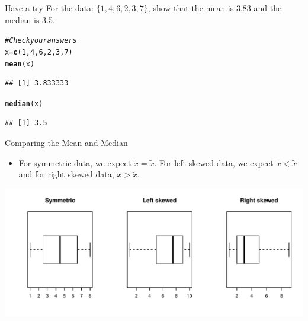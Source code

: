 \documentclass[t,xcolor=pdftex,dvipsnames,table]{beamer}
\makeatletter
\def\maxwidth{ %
  \ifdim\Gin@nat@width>\linewidth
    \linewidth
  \else
    \Gin@nat@width
  \fi
}
\newcommand{\hlnum}[1]{\textcolor[rgb]{0.686,0.059,0.569}{#1}}%
\newcommand{\hlcom}[1]{\textcolor[rgb]{0.678,0.584,0.686}{\textit{#1}}}%
\newcommand{\hlstd}[1]{\textcolor[rgb]{0.345,0.345,0.345}{#1}}%
\newcommand{\hlkwb}[1]{\textcolor[rgb]{0.69,0.353,0.396}{#1}}%
\newcommand{\hlkwd}[1]{\textcolor[rgb]{0.737,0.353,0.396}{\textbf{#1}}}%
\newenvironment{kframe}{%
 \def\at@end@of@kframe{}%
 \ifinner\ifhmode%
  \def\at@end@of@kframe{\end{minipage}}%
  \begin{minipage}{\columnwidth}%
 \fi\fi%
 \def\FrameCommand##1{\hskip\@totalleftmargin \hskip-\fboxsep
 \colorbox{shadecolor}{##1}\hskip-\fboxsep
     \hskip-\linewidth \hskip-\@totalleftmargin \hskip\columnwidth}%
 \MakeFramed {\advance\hsize-\width
   \@totalleftmargin\z@ \linewidth\hsize
   \@setminipage}}%
 {\par\unskip\endMakeFramed%
 \at@end@of@kframe}
\newenvironment{knitrout}{}{} %
\makeatother
\begin{document}
\begin{frame}[fragile]{}

\vspace{.5cm}
\begin{alertblock}{Have a try}
For the data: $\{ 1,4,6,2,3,7\}$, show that the mean is 3.83 and the median is 3.5. 
\end{alertblock}

\begin{knitrout}
\color{fgcolor}\begin{kframe}
\begin{alltt}
\hlcom{#Check your answers}
\hlstd{x}\hlkwb{=}\hlkwd{c}\hlstd{(}\hlnum{1}\hlstd{,}\hlnum{4}\hlstd{,}\hlnum{6}\hlstd{,}\hlnum{2}\hlstd{,}\hlnum{3}\hlstd{,}\hlnum{7}\hlstd{)}
\hlkwd{mean}\hlstd{(x)}
\end{alltt}
\begin{verbatim}
## [1] 3.833333
\end{verbatim}
\begin{alltt}
\hlkwd{median}\hlstd{(x)}
\end{alltt}
\begin{verbatim}
## [1] 3.5
\end{verbatim}
\end{kframe}
\end{knitrout}

\end{frame}


\begin{frame}{Comparing the Mean and Median}
\begin{itemize}
\item 
For symmetric data, we expect $\bar{x} = \tilde{x}$. For left skewed data, we expect $\bar{x} < \tilde{x}$ and for right skewed data, $\bar{x} > \tilde{x}$.
\end{itemize}

\begin{knitrout}
\color{fgcolor}
\includegraphics[width=\maxwidth]{figure/unnamed-chunk-7-1} 

\end{knitrout}
\end{frame}
\end{document}
